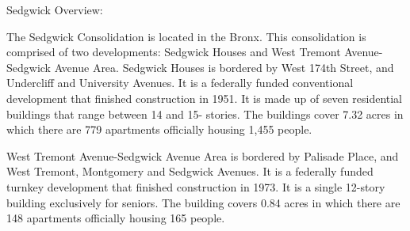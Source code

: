 Sedgwick Overview:  



The Sedgwick Consolidation is located in the Bronx. This consolidation is comprised of two developments: Sedgwick Houses and West Tremont Avenue-Sedgwick Avenue Area. Sedgwick Houses is bordered by West 174th Street, and Undercliff and University Avenues. It is a federally funded conventional development that finished construction in 1951. It is made up of seven residential buildings that range between 14 and 15- stories. The buildings cover 7.32 acres in which there are 779 apartments officially housing 1,455 people.   

  

West Tremont Avenue-Sedgwick Avenue Area is bordered by Palisade Place, and West Tremont, Montgomery and Sedgwick Avenues. It is a federally funded turnkey development that finished construction in 1973. It is a single 12-story building exclusively for seniors. The building covers 0.84 acres in which there are 148 apartments officially housing 165 people.